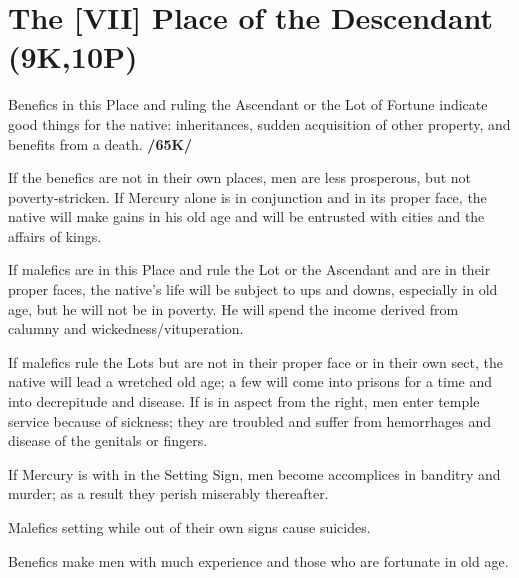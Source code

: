 \section{The [VII] Place of the Descendant (9K,10P)}
Benefics in this Place and ruling the Ascendant or the Lot of Fortune indicate good things for the native: inheritances, sudden acquisition of other property, and benefits from a death. \textbf{/65K/} 

If the benefics are not in their own places, men are less prosperous, but not poverty-stricken. If Mercury alone is in conjunction and in its proper face, the native will make gains in his old age and will be entrusted with cities and the affairs of kings. 

If malefics are in this Place and rule the Lot or the Ascendant and are in their proper faces, the native’s life will be subject to ups and downs, especially in old age, but he will not be in poverty. He will spend the income derived from calumny and wickedness/vituperation. 

If malefics rule the Lots but are not in their proper face or in their own sect, the native will lead a wretched old age; a few will come into prisons for a time and into decrepitude and disease. If \Jupiter\xspace is in aspect from the right, men enter temple service because of sickness; they are troubled and suffer from hemorrhages and disease of the genitals or fingers. 

If Mercury is with \Mars\xspace in the Setting Sign, men become accomplices in banditry and murder; as a result they perish miserably thereafter. 

Malefics setting while out of their own signs cause suicides.

Benefics make men with much experience and those who are fortunate in old age.

\newpage